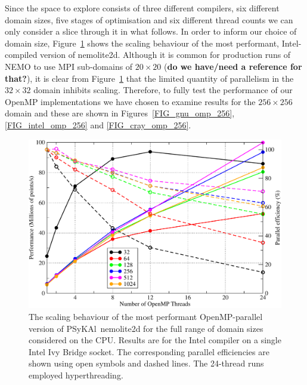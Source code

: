 \documentclass[journal]{IEEEtran}
\newlength{\picwidth}
\newcommand{\psykal}{{PS}y{KA}l\ }
\begin{document}
Since the space to explore consists of three different compilers, six
different domain sizes, five stages of optimisation and six different
thread counts we can only consider a slice through it in what follows.
In order to inform our choice of domain size,
Figure~\ref{FIG_omp_domain_size} shows the scaling behaviour of the
most performant, Intel-compiled version of nemolite2d. Although it is
common for production runs of NEMO to use MPI sub-domains of $20
\times 20$ ({\bf do we have/need a reference for that?}), it is clear
from Figure~\ref{FIG_omp_domain_size} that the limited quantity of
parallelism in the $32 \times 32$ domain inhibits scaling. Therefore,
to fully test the performance of our OpenMP implementations we have
chosen to examine results for the $256 \times 256$ domain and these
are shown in Figures~\ref{FIG_gnu_omp_256}, \ref{FIG_intel_omp_256}
and \ref{FIG_cray_omp_256}.

\begin{figure}
\centering
\includegraphics[width=\picwidth]{omp_scaling_problem_size}
\caption{The scaling behaviour of the most performant OpenMP-parallel
  version of \psykal nemolite2d for the full range of domain sizes
  considered on the CPU. Results are for the Intel compiler on a
  single Intel Ivy Bridge socket. The corresponding parallel
  efficiencies are shown using open symbols and dashed lines. The
  24-thread runs employed hyperthreading.}
\label{FIG_omp_domain_size}
\end{figure}
\end{document}
